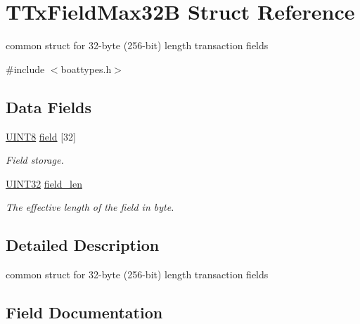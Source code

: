 \hypertarget{struct_t_tx_field_max32_b}{}\section{T\+Tx\+Field\+Max32B Struct Reference}
\label{struct_t_tx_field_max32_b}


common struct for 32-\/byte (256-\/bit) length transaction fields  




{\ttfamily \#include $<$boattypes.\+h$>$}

\subsection*{Data Fields}
\begin{DoxyCompactItemize}
\item 
\mbox{\hyperlink{boattypes_8h_ab27e9918b538ce9d8ca692479b375b6a}{U\+I\+N\+T8}} \mbox{\hyperlink{struct_t_tx_field_max32_b_acb0293932545dc96d43a42d896e401b5}{field}} \mbox{[}32\mbox{]}
\begin{DoxyCompactList}\small\item\em Field storage. \end{DoxyCompactList}\item 
\mbox{\hyperlink{boattypes_8h_ae1e6edbbc26d6fbc71a90190d0266018}{U\+I\+N\+T32}} \mbox{\hyperlink{struct_t_tx_field_max32_b_a37f1b9ab89b19244af4f685f3b6e384a}{field\+\_\+len}}
\begin{DoxyCompactList}\small\item\em The effective length of the field in byte. \end{DoxyCompactList}\end{DoxyCompactItemize}


\subsection{Detailed Description}
common struct for 32-\/byte (256-\/bit) length transaction fields 

\subsection{Field Documentation}
\mbox{\label{struct_t_tx_field_max32_b_acb0293932545dc96d43a42d896e401b5}} 
